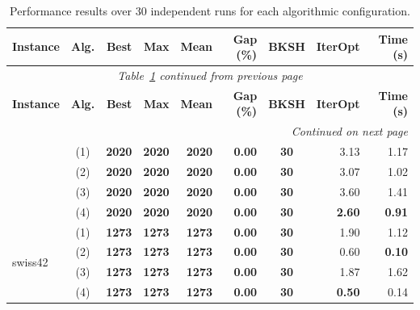 \documentclass[runningheads]{llncs}
\begin{document}
{
\scriptsize
\setlength{\tabcolsep}{5pt}
\renewcommand{\arraystretch}{1.0}

\begin{longtable}{l c r r r r c r r}
\caption{\centering Performance results over 30 independent runs for each algorithmic configuration.
}
\label{tab:performance_results} \\


\toprule
\textbf{Instance} & \textbf{Alg.} & \textbf{Best} & \textbf{Max} & \textbf{Mean} & \textbf{Gap (\%)} & \textbf{BKSH} & \textbf{IterOpt} & \textbf{Time (s)} \\
\midrule
\endfirsthead

\multicolumn{9}{c}{\textit{Table~\ref{tab:performance_results} continued from previous page}} \\
\toprule
\textbf{Instance} & \textbf{Alg.} & \textbf{Best} & \textbf{Max} & \textbf{Mean} & \textbf{Gap (\%)} & \textbf{BKSH} & \textbf{IterOpt} & \textbf{Time (s)} \\
\midrule
\endhead

\multicolumn{9}{r}{\textit{Continued on next page}} \\
\endfoot

\bottomrule
\endlastfoot

\multirow{4}{*}{bays29}
 & (1) & \textbf{2020} & \textbf{2020} & \textbf{2020} & \textbf{0.00} & \textbf{30} & 3.13 & 1.17 \\
 & (2) & \textbf{2020} & \textbf{2020} & \textbf{2020} & \textbf{0.00} & \textbf{30} & 3.07 & 1.02 \\
 & (3) & \textbf{2020} & \textbf{2020} & \textbf{2020} & \textbf{0.00} & \textbf{30} & 3.60 & 1.41 \\
 & (4) & \textbf{2020} & \textbf{2020} & \textbf{2020} & \textbf{0.00} & \textbf{30} & \textbf{2.60} & \textbf{0.91} \\
\midrule

\multirow{4}{*}{swiss42}
 & (1) & \textbf{1273} & \textbf{1273} & \textbf{1273} & \textbf{0.00} & \textbf{30} & 1.90 & 1.12 \\
 & (2) & \textbf{1273} & \textbf{1273} & \textbf{1273} & \textbf{0.00} & \textbf{30} & 0.60 & \textbf{0.10} \\
 & (3) & \textbf{1273} & \textbf{1273} & \textbf{1273} & \textbf{0.00} & \textbf{30} & 1.87 & 1.62 \\
 & (4) & \textbf{1273} & \textbf{1273} & \textbf{1273} & \textbf{0.00} & \textbf{30} & \textbf{0.50} & 0.14 \\
\midrule


\end{longtable}}
\end{document}
